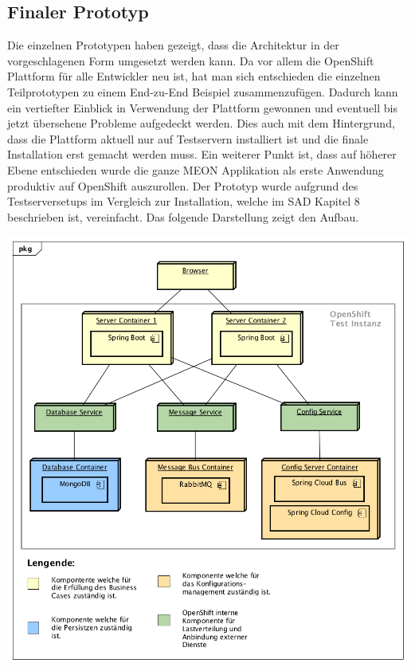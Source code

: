\subsection{Finaler Prototyp}

Die einzelnen Prototypen haben gezeigt, dass die Architektur in der vorgeschlagenen Form umgesetzt werden kann. Da vor allem die OpenShift Plattform für alle Entwickler neu ist, hat man sich entschieden die einzelnen Teilprototypen zu einem End-zu-End Beispiel zusammenzufügen. Dadurch kann ein vertiefter Einblick in Verwendung der Plattform gewonnen und eventuell bis jetzt übersehene Probleme aufgedeckt werden. Dies auch mit dem Hintergrund, dass die Plattform aktuell nur auf Testservern installiert ist und die finale Installation erst gemacht werden muss. Ein weiterer Punkt ist, dass auf höherer Ebene entschieden wurde die ganze MEON Applikation als erste Anwendung produktiv auf OpenShift auszurollen.\newline\newline
Der Prototyp wurde aufgrund des Testserversetups im Vergleich zur Installation, welche im SAD Kapitel 8 beschrieben ist, vereinfacht. Das folgende Darstellung zeigt den Aufbau.

\begin{center}
	\includegraphics[scale=0.60]{PrototypDeployment.png}
\end{center}

